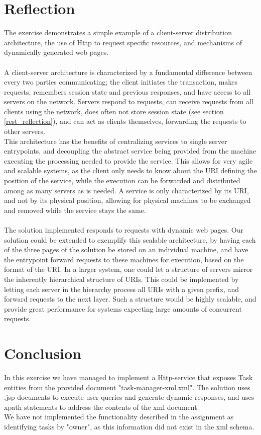 	\section{Reflection}
	\label{servlet_reflection}
		The exercise demonstrates a simple example of a client-server distribution architecture, the use of Http to request specific resources, and mechanisms of dynamically generated web pages.\\\\
		A client-server architecture is characterized by a fundamental difference between every two parties communicating; the client initiates the transaction, makes requests, remembers session state and previous responses, and have access to all servers on the network. Servers respond to requests, can receive requests from all clients using the network, does often not store session state (see section \ref{rest_reflection}), and can act as clients themselves, forwarding the requests to other servers.\\
		This architecture has the benefits of centralizing services to single server entrypoints, and decoupling the abstract service being provided from the machine executing the processing needed to provide the service. This allows for very agile and scalable systems, as the client only needs to know about the URI defining the position of the service, while the execution can be forwarded and distributed among as many servers as is needed. A service is only characterized by its URI, and not by its physical position, allowing for physical machines to be exchanged and removed while the service stays the same. \\\\
		The solution implemented responds to requests with dynamic web pages. Our solution could be extended to exemplify this scalable architecture, by having each of the three pages of the solution be stored on an individual machine, and have the entrypoint forward requests to these machines for execution, based on the format of the URI. In a larger system, one could let a structure of servers mirror the inherently hierarchical structure of URIs. This could be implemented by letting each server in the hierarchy process all URIs with a given prefix, and forward requests to the next layer. Such a structure would be highly scalable, and provide great performance for systems expecting large amounts of concurrent requests.
	\section{Conclusion}
	\label{servlet_conclusion}
		In this exercise we have managed to implement a Http-service that exposes Task entities from the provided document "task-manager-xml.xml". The solution uses .jsp documents to execute user queries and generate dynamic responses, and uses xpath statements to address the contents of the xml document. \\
		We have not implemented the functionality described in the assignment as identifying tasks by "owner", as this information did not exist in the xml schema.